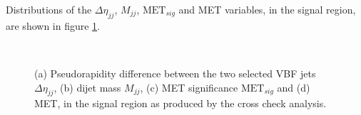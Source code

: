 Distributions of the $\Delta\eta_{jj}$, $M_{jj}$, $\text{MET}_{sig}$ and \gls{MET} variables, in the signal region, are shown in figure \ref{FIGURE:ParkedDataAnalysis_Results_SigRegPlots}. 

\begin{figure}[!htb]
\centering
{}
 \\
\caption[Pseudorapidity difference between the two selected VBF jets $\Delta\eta_{jj}$, dijet mass $M_{jj}$, MET significance $\text{MET}_{sig}$ and MET, in the signal region as produced by the cross check analysis.]
{(a) Pseudorapidity difference between the two selected \gls{VBF} jets $\Delta\eta_{jj}$, (b) dijet mass $M_{jj}$, (c) \gls{MET} significance $\text{MET}_{sig}$ and (d) \gls{MET}, in the signal region as produced by the cross check analysis.}
\label{FIGURE:ParkedDataAnalysis_Results_SigRegPlots}
\end{figure}

